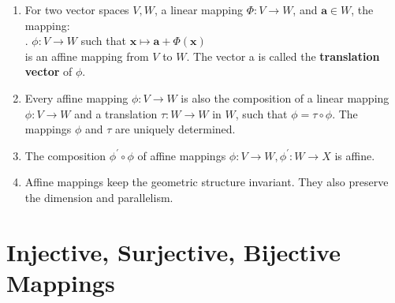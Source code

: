 \begin{enumerate}
    \item
    \begin{definition}
        For two vector spaces $V, W$, a linear mapping $\Phi : V \to W$, and $\bm{a} \in W$, the mapping:
        \hfill \cite{mfml/book/mml/Deisenroth-Faisal-Ong}
        \\
        .\hfill
        $ \phi : V \to W $ such that $ \bm{x} \mapsto \bm{a} + \Phi(\bm{x}) $
        \hfill \cite{mfml/book/mml/Deisenroth-Faisal-Ong}
        \\
        is an affine mapping from $V$ to $W$.
        The vector a is called the \textbf{translation vector} of $\phi$.
        \hfill \cite{mfml/book/mml/Deisenroth-Faisal-Ong}
    \end{definition}

    \item Every affine mapping $\phi  : V \to W$ is also the composition of a linear mapping $\phi  : V \to W$ and a translation $\tau : W \to W$ in $W$, such that $\phi  = \tau \circ \phi $.
    The mappings $\phi $ and $\tau$ are uniquely determined.
    \hfill \cite{mfml/book/mml/Deisenroth-Faisal-Ong}

    \item The composition $\phi ^\prime \circ \phi $ of affine mappings $\phi  : V \to W, \phi ^\prime: W \to X$ is affine.
    \hfill \cite{mfml/book/mml/Deisenroth-Faisal-Ong}

    \item Affine mappings keep the geometric structure invariant.
    They also preserve the dimension and parallelism.
    \hfill \cite{mfml/book/mml/Deisenroth-Faisal-Ong}
\end{enumerate}



























\section{Injective, Surjective, Bijective Mappings}

